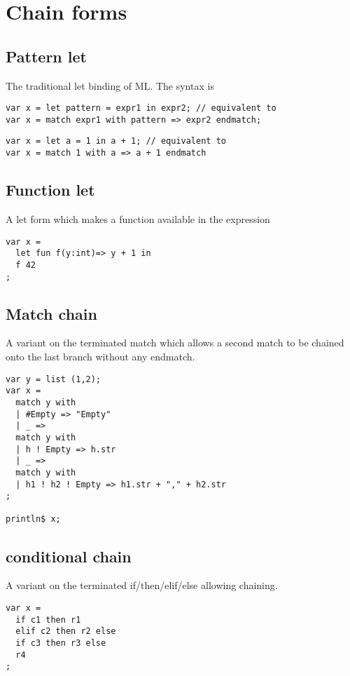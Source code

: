 \documentclass[oneside]{book}
\begin{document}
\section{Chain forms}
\subsection{Pattern let}
The traditional let binding of ML.
The syntax is 

\begin{verbatim}
var x = let pattern = expr1 in expr2; // equivalent to
var x = match expr1 with pattern => expr2 endmatch;
\end{verbatim}

\begin{verbatim}
var x = let a = 1 in a + 1; // equivalent to
var x = match 1 with a => a + 1 endmatch
\end{verbatim}


\subsection{Function let}
A let form which makes a function available in the
expression

\begin{verbatim}
var x = 
  let fun f(y:int)=> y + 1 in 
  f 42
;
\end{verbatim}

\subsection{Match chain}
A variant on the terminated match which allows a second
match to be chained onto the last branch without any endmatch.

\begin{verbatim}
var y = list (1,2);
var x = 
  match y with
  | #Empty => "Empty"
  | _ =>
  match y with 
  | h ! Empty => h.str
  | _ =>
  match y with 
  | h1 ! h2 ! Empty => h1.str + "," + h2.str
;

println$ x;
\end{verbatim}

\subsection{conditional chain}
A variant on the terminated if/then/elif/else allowing chaining.

\begin{verbatim}
var x = 
  if c1 then r1 
  elif c2 then r2 else
  if c3 then r3 else
  r4
;
\end{verbatim}
\end{document}
